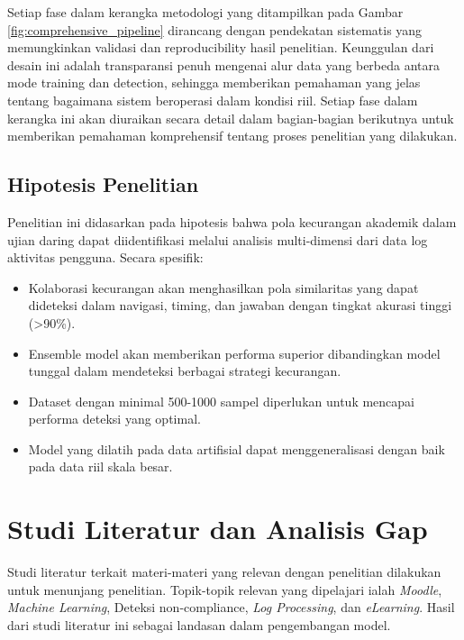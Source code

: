 Setiap fase dalam kerangka metodologi yang ditampilkan pada Gambar \ref{fig:comprehensive_pipeline} dirancang dengan pendekatan sistematis yang memungkinkan validasi dan reproducibility hasil penelitian. Keunggulan dari desain ini adalah transparansi penuh mengenai alur data yang berbeda antara mode training dan detection, sehingga memberikan pemahaman yang jelas tentang bagaimana sistem beroperasi dalam kondisi riil. Setiap fase dalam kerangka ini akan diuraikan secara detail dalam bagian-bagian berikutnya untuk memberikan pemahaman komprehensif tentang proses penelitian yang dilakukan.

\subsection{Hipotesis Penelitian}
Penelitian ini didasarkan pada hipotesis bahwa pola kecurangan akademik dalam ujian daring dapat diidentifikasi melalui analisis multi-dimensi dari data log aktivitas pengguna. Secara spesifik:
\begin{itemize}
    \item Kolaborasi kecurangan akan menghasilkan pola similaritas yang dapat dideteksi dalam navigasi, timing, dan jawaban dengan tingkat akurasi tinggi (>90\%).
    \item Ensemble model akan memberikan performa superior dibandingkan model tunggal dalam mendeteksi berbagai strategi kecurangan.
    \item Dataset dengan minimal 500-1000 sampel diperlukan untuk mencapai performa deteksi yang optimal.
    \item Model yang dilatih pada data artifisial dapat menggeneralisasi dengan baik pada data riil skala besar.
\end{itemize}

\section{Studi Literatur dan Analisis Gap}
\label{sec:tinjauanPustaka}
Studi literatur terkait materi-materi yang relevan dengan penelitian dilakukan untuk menunjang penelitian. Topik-topik relevan yang dipelajari ialah \textit{Moodle}, \textit{Machine Learning}, Deteksi non-compliance, \textit{Log Processing}, dan \textit{eLearning}. Hasil dari studi literatur ini sebagai landasan dalam pengembangan model.

